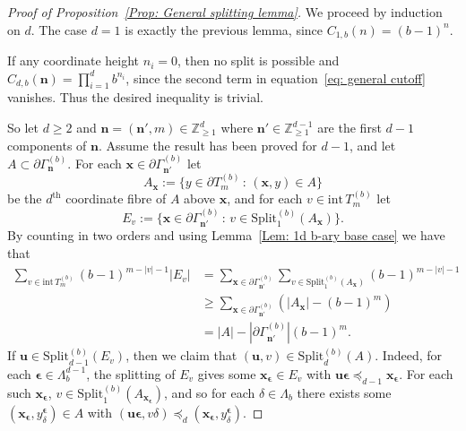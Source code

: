 \documentclass[11pt]{amsart}
\newcommand{\Z}{\mathbb{Z}}  %
\newcommand\labs[1]{\left\lvert#1\right\rvert}
\newcommand{\Split}{\mathrm{Split}}
\newcommand{\inte}{\mathrm{int}\,}
\renewcommand{\geq}{\geqslant}
\theoremstyle{plain}
\theoremstyle{definition}
\theoremstyle{remark}
\begin{document}
\begin{proof}[Proof of Proposition~\ref{Prop: General splitting lemma}]
We proceed by induction on $d$. The case $d=1$ is exactly the previous lemma, since $C_{1,b}(n)=(b-1)^n$.

If any coordinate height $n_i=0$, then no split is possible and $C_{d,b}(\mathbf{n}) = \prod_{i=1}^d b^{n_i}$, since the second term in equation~\eqref{eq: general cutoff} vanishes. Thus the desired inequality is trivial.

So let $d\geq 2$ and $\mathbf{n} =(\mathbf{n}',m) \in \Z_{\geq 1}^d$ where $\mathbf{n}'\in \Z_{\geq 1}^{d-1}$ are the first $d-1$ components of $\mathbf{n}$. Assume the result has been proved for $d-1$, and let $A\subset \partial \Gamma_{\mathbf{n}}^{(b)}$. For each $\mathbf{x}\in \partial \Gamma_{\mathbf{n}'}^{(b)}$ let
\[ A_{\mathbf{x}}:= \{ y \in \partial T_m^{(b)} \, : \, (\mathbf{x},y)\in A\}\]
be the $d^\text{th}$ coordinate fibre of $A$ above $\mathbf{x}$, and for each $v \in \inte T_m^{(b)}$ let
\[ E_v:=\{\mathbf{x} \in \partial \Gamma_{\mathbf{n}'}^{(b)} \, : \, v \in \Split_{1}^{(b)}(A_{\mathbf{x}})\}.\]
By counting in two orders and using Lemma~\ref{Lem: 1d b-ary base case} we have that
\begin{align}
\sum_{v\in \inte T_m^{(b)}} (b-1)^{m-\labs{v}-1}\labs{E_v} &= \sum_{\mathbf{x}\in \partial \Gamma_{\mathbf{n}'}^{(b)}} \sum_{v \in \Split_{1}^{(b)}(A_\mathbf{x})} (b-1)^{m-\labs{v}-1} \nonumber \\
& \geq \sum_{\mathbf{x}\in \partial \Gamma_{\mathbf{n}'}^{(b)}} \left(\labs{A_{\mathbf{x}}} - (b-1)^m \right) \nonumber \\
&= \labs{A} - \labs{\partial \Gamma_{\mathbf{n}'}^{(b)}}(b-1)^m. \label{eq: general split eq 1}
\end{align}
If $\mathbf{u} \in \Split_{d-1}^{(b)}(E_v)$, then we claim that $(\mathbf{u},v) \in \Split_{d}^{(b)}(A)$. Indeed, for each $\bm{\epsilon} \in \Lambda_{b}^{d-1}$, the splitting of $E_v$ gives some $\mathbf{x}_{\bm{\epsilon}} \in E_v$ with $\mathbf{u}\bm{\epsilon} \preceq_{d-1} \mathbf{x}_{\bm{\epsilon}}$. For each such $\mathbf{x}_{\bm{\epsilon}}$, $v\in \Split_{1}^{(b)}(A_{\mathbf{x}_{\bm{\epsilon}}})$, and so for each $\delta \in \Lambda_b$ there exists some $(\mathbf{x}_{\bm{\epsilon}},y_\delta^{\bm{\epsilon}}) \in A$ with $(\mathbf{u} \bm{\epsilon},v \delta)\preceq_d (\mathbf{x}_{\bm{\epsilon}},y_\delta^{\bm{\epsilon}})$.


\end{proof}
\end{document}
